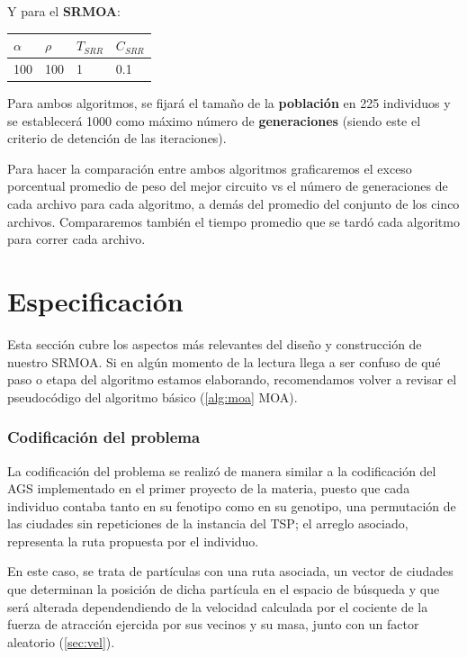 \documentclass[12pt]{article}
\begin{document}
Y para el \textbf{SRMOA}:
\begin{center}
\begin{tabularx}{0.30\textwidth}{|X|X|X|X|}
  \hline
\textbf{$\alpha$} &  \textbf{$\rho$} & \textbf{$T_{SRR}$} & \textbf{$C_{SRR}$}\\ \hline
100 & 100 & 1 & 0.1 \\ \hline
\end{tabularx}
\end{center}

Para ambos algoritmos, se fijará el tamaño de la \textbf{población} en 225 individuos y se establecerá 1000 como máximo número de \textbf{generaciones} (siendo este el criterio de detención de las iteraciones).

Para hacer la comparación entre ambos algoritmos graficaremos el exceso porcentual promedio de peso del mejor circuito vs el número de generaciones de cada archivo para cada algoritmo, a demás del promedio del conjunto de los cinco archivos. Compararemos también el tiempo promedio que se tardó cada algoritmo para correr cada archivo.

\newpage

\section{Especificación}\label{sec:esp}
Esta sección cubre los aspectos más relevantes del diseño y construcción
de nuestro SRMOA. Si en algún momento de la lectura llega a ser confuso
de qué paso o etapa del algoritmo estamos elaborando, recomendamos volver a revisar el pseudocódigo del algoritmo básico (\ref{alg:moa} MOA).
\subsubsection*{Codificación del problema}
La codificación del problema se realizó de manera similar a la codificación del AGS implementado en el primer proyecto de la materia, puesto que
cada individuo contaba tanto en su fenotipo como en su genotipo, una permutación de las ciudades sin repeticiones de la instancia del TSP; el arreglo asociado, representa la ruta propuesta por el individuo.

En este caso, se trata de partículas con una ruta asociada, un vector de ciudades que determinan la posición de dicha partícula en el espacio de
búsqueda y que será alterada dependendiendo de la velocidad calculada por el cociente de la fuerza de atracción ejercida por sus vecinos y su masa,
junto con un factor aleatorio (\ref{sec:vel}).
\end{document}
